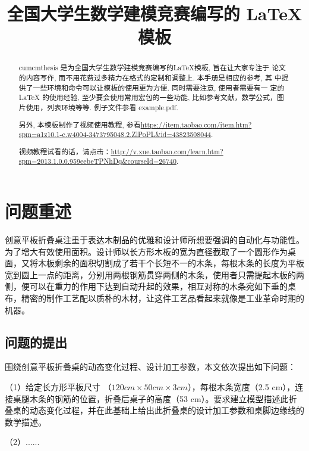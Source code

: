 \documentclass{cumcmthesis}
\title{全国大学生数学建模竞赛编写的 \LaTeX{} 模板}
\begin{document}
 \maketitle
 \begin{abstract}
cumcmthesis 是为全国大学生数学建模竞赛编写的\LaTeX{}模板, 旨在让大家专注于 论文的内容写作, 而不用花费过多精力在格式的定制和调整上. 本手册是相应的参考, 其 中提供了一些环境和命令可以让模板的使用更为方便. 同时需要注意, 使用者需要有一 定的 \LaTeX{} 的使用经验, 至少要会使用常用宏包的一些功能, 比如参考文献，数学公式，图片使用，列表环境等等. 例子文件参看 example.pdf.

另外, 本模板制作了视频使用教程, 参看\url{https://item.taobao.com/item.htm?spm=a1z10.1-c.w4004-3473795048.2.ZlPoPL&id=43823508044}.

视频教程试看的话，请点击：\url{http://v.xue.taobao.com/learn.htm?spm=2013.1.0.0.959eebeTPNhDq&courseId=26740}.

\end{abstract}

\tableofcontents

\clearpage

\section{问题重述}

创意平板折叠桌注重于表达木制品的优雅和设计师所想要强调的自动化与功能性。为了增大有效使用面积。设计师以长方形木板的宽为直径截取了一个圆形作为桌面，又将木板剩余的面积切割成了若干个长短不一的木条，每根木条的长度为平板宽到圆上一点的距离，分别用两根钢筋贯穿两侧的木条，使用者只需提起木板的两侧，便可以在重力的作用下达到自动升起的效果，相互对称的木条宛如下垂的桌布，精密的制作工艺配以质朴的木材，让这件工艺品看起来就像是工业革命时期的机器。

\subsection{问题的提出}

围绕创意平板折叠桌的动态变化过程、设计加工参数，本文依次提出如下问题：

（1）给定长方形平板尺寸 （$120 cm \times 50 cm \times 3 cm$），每根木条宽度（2.5 cm），连接桌腿木条的钢筋的位置，折叠后桌子的高度（53 cm）。要求建立模型描述此折叠桌的动态变化过程，并在此基础上给出此折叠桌的设计加工参数和桌脚边缘线的数学描述。

（2）......
\end{document}
